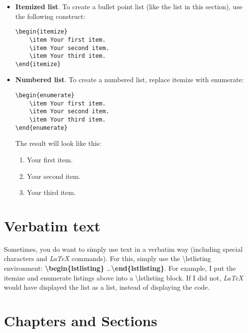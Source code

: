 \begin{itemize}
\item \textbf{Itemized list}. To create a bullet point list (like the list in this section), use the following construct:\begin{lstlisting}
\begin{itemize}
	\item Your first item.
	\item Your second item.
	\item Your third item.
\end{itemize}
\end{lstlisting}
\item \textbf{Numbered list}. To create a numbered list, replace itemize with enumerate:\begin{lstlisting}
\begin{enumerate}
	\item Your first item.
	\item Your second item.
	\item Your third item.
\end{enumerate}
\end{lstlisting}

The result will look like this:\begin{enumerate}
	\item Your first item.
	\item Your second item.
	\item Your third item.
\end{enumerate}


\end{itemize}

\section{Verbatim text}\label{c1_verbatim:sec}

Sometimes, you do want to simply use text in a verbatim way (including special characters and \textit{LaTeX} commands). For this, simply use the \textbackslash lstlisting environment: \textbf{\textbackslash begin\{lstlisting\}} \dots \textbf{\textbackslash end\{lstlisting\}}. For example, I put the itemize and enumerate listings above into a \textbackslash lstlisting block. If I did not, \textit{LaTeX} would have displayed the list as a list, instead of displaying the code.



\section{Chapters and Sections}\label{c1_chaptersandsections:sec}

